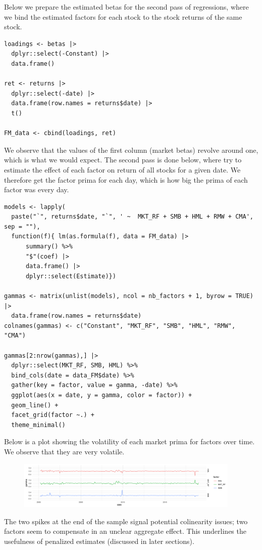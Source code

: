 Below we prepare the estimated betas for the second pass of regressions, where we bind the estimated factors for each stock to the stock returns of the same stock. 
\begin{lstlisting}
loadings <- betas |> 
  dplyr::select(-Constant) |> 
  data.frame()

ret <- returns |> 
  dplyr::select(-date) |> 
  data.frame(row.names = returns$date) |> 
  t()

FM_data <- cbind(loadings, ret)
\end{lstlisting}

We observe that the values of the first column (market betas) revolve around one, which is what we would expect. The second pass is done below, where try to estimate the effect of each factor on return of all stocks for a given date. We therefore get the factor prima for each day, which is how big the prima of each factor was every day.
\begin{lstlisting}
models <- lapply(
  paste("`", returns$date, "`", ' ~  MKT_RF + SMB + HML + RMW + CMA', sep = ""),
  function(f){ lm(as.formula(f), data = FM_data) |> 
      summary() %>%
      "$"(coef) |> 
      data.frame() |> 
      dplyr::select(Estimate)})

gammas <- matrix(unlist(models), ncol = nb_factors + 1, byrow = TRUE) |> 
  data.frame(row.names = returns$date)
colnames(gammas) <- c("Constant", "MKT_RF", "SMB", "HML", "RMW", "CMA") 

gammas[2:nrow(gammas),] |> 
  dplyr::select(MKT_RF, SMB, HML) %>% 
  bind_cols(date = data_FM$date) %>%
  gather(key = factor, value = gamma, -date) %>% 
  ggplot(aes(x = date, y = gamma, color = factor)) +
  geom_line() +
  facet_grid(factor ~.) + 
  theme_minimal()
\end{lstlisting}

Below is a plot showing the volatility of each market prima for factors over time. We observe that they are very volatile. 
\begin{figure}[H]
    \centering
    \includegraphics[width=0.95\textwidth]{part_1/images/factor_prima_markets.png}
\end{figure}

The two spikes at the end of the sample signal potential colinearity issues; two factors seem to compensate in an unclear aggregate effect. This underlines the usefulness of penalized estimates (discussed in later sections).


